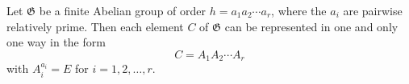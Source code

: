 Let $\mathfrak{G}$ be a finite Abelian group of order $h = a_1 a_2 \cdots a_r$, where the $a_i$ are pairwise relatively prime. Then each element $C$ of $\mathfrak{G}$ can be represented in one and only one way in the form
$$C = A_1 A_2 \cdots A_r$$
with $A_i^{a_i} = E$ for $i = 1, 2, \ldots, r$.
